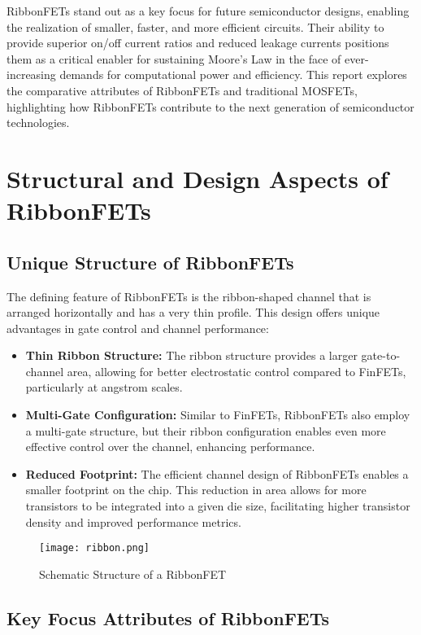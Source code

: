 \documentclass[12pt]{report}
\begin{document}
\begin{titlepage}
RibbonFETs stand out as a key focus for future semiconductor designs, enabling the realization of smaller, faster, and more efficient circuits. Their ability to provide superior on/off current ratios and reduced leakage currents positions them as a critical enabler for sustaining Moore's Law in the face of ever-increasing demands for computational power and efficiency. This report explores the comparative attributes of RibbonFETs and traditional MOSFETs, highlighting how RibbonFETs contribute to the next generation of semiconductor technologies.


\section{Structural and Design Aspects of RibbonFETs}
\subsection{Unique Structure of RibbonFETs}
The defining feature of RibbonFETs is the ribbon-shaped channel that is arranged horizontally and has a very thin profile. This design offers unique advantages in gate control and channel performance:
\begin{itemize}
    \item \textbf{Thin Ribbon Structure:} The ribbon structure provides a larger gate-to-channel area, allowing for better electrostatic control compared to FinFETs, particularly at angstrom scales.
    \item \textbf{Multi-Gate Configuration:} Similar to FinFETs, RibbonFETs also employ a multi-gate structure, but their ribbon configuration enables even more effective control over the channel, enhancing performance.
    \item \textbf{Reduced Footprint:} The efficient channel design of RibbonFETs enables a smaller footprint on the chip. This reduction in area allows for more transistors to be integrated into a given die size, facilitating higher transistor density and improved performance metrics.
\end{itemize}

\begin{figure}[h]
    \centering
    \texttt{[image: ribbon.png]} %
    \caption{Schematic Structure of a RibbonFET}
    \label{fig:ribbonfet_structure}
\end{figure}


\subsection{Key Focus Attributes of RibbonFETs}


\end{titlepage}
\end{document}
